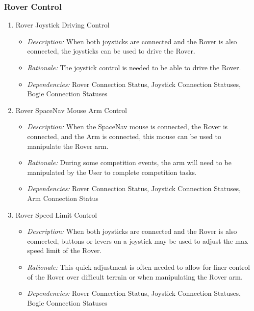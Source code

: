 \documentclass[onecolumn, draftclsnofoot, 10pt, compsoc]{IEEEtran}
\newcommand{\functRequ}[4]{
\item #1%
\par
\begin{itemize}
\item \textit{Description:} #2.%
\item \textit{Rationale:} #3.%
\item \textit{Dependencies:} #4%
\end{itemize}
}
\begin{document}
\subsubsection{Rover Control}
\begin{enumerate}
\functRequ{Rover Joystick Driving Control}
{When both joysticks are connected and the Rover is also connected, the joysticks can be used to drive the Rover}
{The joystick control is needed to be able to drive the Rover}
{Rover Connection Status, Joystick Connection Statuses, Bogie Connection Statuses}

\functRequ{Rover SpaceNav Mouse Arm Control}
{When the SpaceNav mouse is connected, the Rover is connected, and the Arm is connected, this mouse can be used to manipulate the Rover arm}
{During some competition events, the arm will need to be manipulated by the User to complete competition tasks}
{Rover Connection Status, Joystick Connection Statuses, Arm Connection Status}

\functRequ{Rover Speed Limit Control}
{When both joysticks are connected and the Rover is also connected, buttons or levers on a joystick may be used to adjust the max speed limit of the Rover}
{This quick adjustment is often needed to allow for finer control of the Rover over difficult terrain or when manipulating the Rover arm}
{Rover Connection Status, Joystick Connection Statuses, Bogie Connection Statuses}
\end{enumerate}
\end{document}
